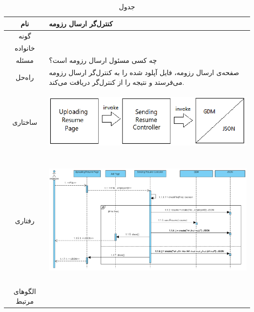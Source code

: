 \begin{table}[H]
	\begin{adjustbox}{width=\textwidth}
		\begin{tabular}{|c|p{\textwidth}|}
			\hline
			نام &
			کنترل‌گر ارسال رزومه\\ 
			\hline
			گونه & 
			\grasp \\
			\hline
			خانواده &
			\controller \\
			\hline
			مسئله & 
			چه کسی مسئول ارسال رزومه است؟\\
			\hline
			راه‌حل& 
			صفحه‌ی ارسال رزومه، فایل آپلود شده را به کنترل‌گر ارسال رزومه می‌فرستد و نتیجه‌ را از کنترل‌گر دریافت می‌کند. \\
			\hline
			ساختاری & 
			\begin{minipage}{\textwidth}
				\begin{flushleft}
					\begin{minipage}{\textwidth}
						\includegraphics[width=13cm, height=2.7cm]{./images/7-6-1}
					\end{minipage}
				\end{flushleft}
			\end{minipage}
			
			\\
			\hline
			رفتاری & 
			\begin{minipage}{\textwidth}
				\begin{flushleft}
					\begin{minipage}{\textwidth}
						\includegraphics[width=13.5cm, height=6cm]{./images/7-6-2}
					\end{minipage}
				\end{flushleft}
			\end{minipage}
			\\
			\hline
			الگو‌های مرتبط& \\
			\hline
		\end{tabular}
	\end{adjustbox}
	\caption{جدول }
	\label{table-with-pic:6}
\end{table}

